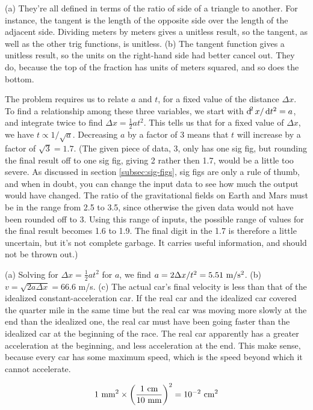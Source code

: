 (a) They're all defined in terms of the ratio of side of a triangle
to another. For instance, the tangent is the length of the opposite
side over the length of the adjacent side. Dividing meters by meters
gives a unitless result, so the tangent, as well as the other trig
functions, is unitless.
(b) The tangent function gives a unitless result, so the units
on the right-hand side had better cancel out. They do,
because the top of the fraction has units of meters squared,
and so does the bottom.

The problem requires us to relate $a$ and $t$, for a fixed value of the distance $\Delta x$. To find a
relationship among these three variables, we start with $\operatorname{d\!}^2 x/\operatorname{d\!} t^2=a$, and integrate twice
to find
$\Delta x=\frac{1}{2}at^2$. This tells us that for a fixed value of $\Delta x$, we have $t\propto 1/\sqrt{a}$.
Decreasing $a$ by a factor of 3 means that $t$ will
increase by a factor of $\sqrt{3}=1.7$. (The given piece of data, 3, only has one sig fig,
but rounding the final result off to one sig fig, giving 2 rather then 1.7,
would be a little too severe. As discussed in section \ref{subsec:sig-figs}, sig figs are
only a rule of thumb, and when in doubt, you can change the input data to see how much
the output would have changed. The ratio of the gravitational fields on Earth and Mars
must be in the range from 2.5 to 3.5, since otherwise the given data would not have been
rounded off to 3. Using this range of inputs, the possible range of values for the final
result becomes 1.6 to 1.9. The final digit in the 1.7 is therefore a little uncertain,
but it's not complete garbage. It carries useful information, and should not be thrown out.)

(a) Solving for $\Delta x=\frac{1}{2}at^2$ for $a$, 
we find $a=2\Delta x/t^2=5.51\ \munit/\sunit^2$.
(b) $v=\sqrt{2a\Delta x}=66.6$ m/s. (c) The actual car's final
velocity is less than that of the idealized constant-acceleration
car. If the real car and the idealized car covered the
quarter mile in the same time but the real car was moving
more slowly at the end than the idealized one, the real car
must have been going faster than the idealized car at the
beginning of the race. The real car apparently has a greater
acceleration at the beginning, and less acceleration at the
end. This make sense, because every car has some maximum
speed, which is the speed beyond which it cannot accelerate.

\begin{equation*}
1\ \zu{mm}^2 \times \left(\frac{1\ \zu{cm}}{10\ \zu{mm}}\right)^2 = 10^{-2}\ \zu{cm}^2
\end{equation*}

